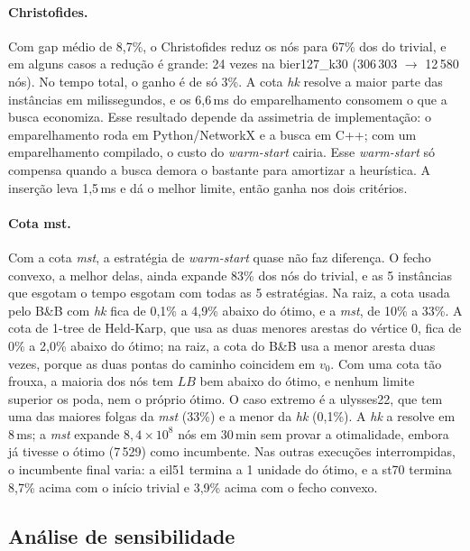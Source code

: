 \documentclass[12pt]{article}
\begin{document}
\paragraph{Christofides.} Com gap médio de 8,7\%, o Christofides reduz os nós para 67\%
dos do trivial, e em alguns casos a redução é grande: 24 vezes na bier127\_k30
(306\,303 $\to$ 12\,580 nós). No tempo total, o ganho é de só 3\%. A cota \textit{hk}
resolve a maior parte das instâncias em milissegundos, e os 6,6\,ms do emparelhamento
consomem o que a busca economiza. Esse resultado depende da assimetria de implementação: o
emparelhamento roda em Python/NetworkX e a busca em C++; com um emparelhamento compilado,
o custo do \textit{warm-start} cairia. Esse \textit{warm-start} só compensa quando a busca
demora o bastante para amortizar a heurística. A inserção leva 1,5\,ms e dá o melhor
limite, então ganha nos dois critérios.

\paragraph{Cota mst.} Com a cota \textit{mst}, a estratégia de \textit{warm-start} quase
não faz diferença. O fecho convexo, a melhor delas, ainda expande 83\% dos nós do
trivial, e as 5 instâncias que esgotam o tempo esgotam com todas as 5 estratégias. Na raiz, a cota usada pelo B\&B com \textit{hk} fica de 0,1\% a 4,9\% abaixo do ótimo, e a
\textit{mst}, de 10\% a 33\%. A cota de 1-tree de Held-Karp, que usa as duas menores
arestas do vértice 0, fica de 0\% a 2,0\% abaixo do ótimo; na raiz, a cota do B\&B usa a
menor aresta duas vezes, porque as duas pontas do caminho coincidem em $v_0$. Com uma cota tão frouxa, a maioria dos nós tem $LB$ bem abaixo do ótimo, e
nenhum limite superior os poda, nem o próprio ótimo. O caso extremo é a ulysses22, que
tem uma das maiores folgas da \textit{mst} (33\%) e a menor da \textit{hk} (0,1\%). A
\textit{hk} a resolve em 8\,ms; a \textit{mst} expande $8{,}4 \times 10^8$ nós em
30\,min sem provar a otimalidade, embora já tivesse o ótimo (7\,529) como incumbente.
Nas outras execuções interrompidas, o incumbente final varia: a eil51 termina a 1
unidade do ótimo, e a st70 termina 8,7\% acima com o início trivial e 3,9\% acima com o
fecho convexo.

\subsection{Análise de sensibilidade}
\end{document}
